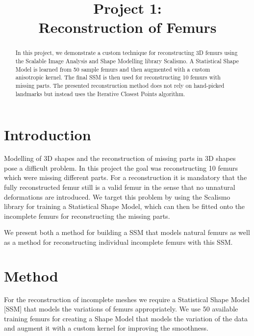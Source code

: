 \documentclass{article}
\begin{document}
	\title{Project 1:\\ Reconstruction of Femurs}
	\begin{abstract}
		In this project, we demonstrate a custom technique for reconstructing 3D femurs using the Scalable Image Analysis and Shape Modelling library Scalismo. 
		A Statistical Shape Model is learned from 50 sample femurs and then augmented with a custom anisotropic kernel. The final SSM is then used for reconstructing 10 femurs with missing parts. 
		The presented reconstruction method does not rely on hand-picked landmarks but instead uses the Iterative Closest Points algorithm.
	\end{abstract}
	
	\section{Introduction}
	
	Modelling of 3D shapes and the reconstruction of missing parts in 3D shapes pose a difficult problem. In this project the goal was reconstructing 10 femurs which were missing different parts. For a reconstruction it is mandatory that the fully reconstructed femur still is a valid femur in the sense that no unnatural deformations are introduced. We target this problem by using the Scalismo library for training a Statistical Shape Model, which can then be fitted onto the incomplete femurs for reconstructing the missing parts.
	
	We present both a method for building a SSM that models natural femurs as well as a method for reconstructing individual incomplete femurs with this SSM.
	

	\section{Method}
	For the reconstruction of incomplete meshes we require a Statistical Shape Model [SSM] that models the variations of femurs appropriately. We use 50 available training femurs for creating a Shape Model that models the variation of the data and augment it with a custom kernel for improving the smoothness.
	
\end{document}

